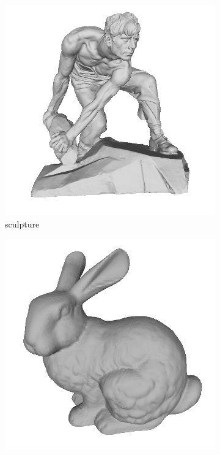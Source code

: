 \documentclass[border=15pt, multi, tikz]{article}
\begin{document}
\begin{figure}[!h]
	\begin{subfigure}[b]{0.23\linewidth}
		\includegraphics[width=\linewidth]{./Figures/train-dataset/04.bronze-sculpture.png}
		\caption{sculpture}
	\end{subfigure}
	\begin{subfigure}[b]{0.23\linewidth}
		\includegraphics[width=\linewidth]{./Figures/train-dataset/05.bunny.png}

\end{subfigure}
\end{figure}
\end{document}
